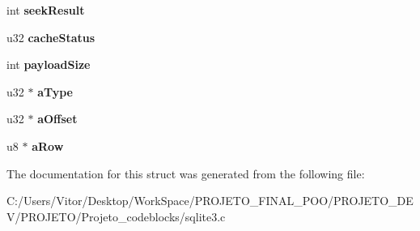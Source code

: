 \begin{DoxyCompactItemize}
\item 
\hypertarget{struct_vdbe_cursor_a5eff86e2a9c87dc15956ad362aa03f05}{int {\bfseries seek\-Result}}\label{struct_vdbe_cursor_a5eff86e2a9c87dc15956ad362aa03f05}

\item 
\hypertarget{struct_vdbe_cursor_acf243b5a94a6e5a11341d6fece473c00}{u32 {\bfseries cache\-Status}}\label{struct_vdbe_cursor_acf243b5a94a6e5a11341d6fece473c00}

\item 
\hypertarget{struct_vdbe_cursor_a5c1fa124d7f27a30e14ef0f455955cab}{int {\bfseries payload\-Size}}\label{struct_vdbe_cursor_a5c1fa124d7f27a30e14ef0f455955cab}

\item 
\hypertarget{struct_vdbe_cursor_a6992d2bf9eb8480985aec47dae58f1ab}{u32 $\ast$ {\bfseries a\-Type}}\label{struct_vdbe_cursor_a6992d2bf9eb8480985aec47dae58f1ab}

\item 
\hypertarget{struct_vdbe_cursor_a17431e67b341282aeb6c026cd01ec1e9}{u32 $\ast$ {\bfseries a\-Offset}}\label{struct_vdbe_cursor_a17431e67b341282aeb6c026cd01ec1e9}

\item 
\hypertarget{struct_vdbe_cursor_a6bd10979ffb5d4828967eea1d6e0d2c8}{u8 $\ast$ {\bfseries a\-Row}}\label{struct_vdbe_cursor_a6bd10979ffb5d4828967eea1d6e0d2c8}

\end{DoxyCompactItemize}


The documentation for this struct was generated from the following file\-:\begin{DoxyCompactItemize}
\item 
C\-:/\-Users/\-Vitor/\-Desktop/\-Work\-Space/\-P\-R\-O\-J\-E\-T\-O\-\_\-\-F\-I\-N\-A\-L\-\_\-\-P\-O\-O/\-P\-R\-O\-J\-E\-T\-O\-\_\-\-D\-E\-V/\-P\-R\-O\-J\-E\-T\-O/\-Projeto\-\_\-codeblocks/sqlite3.\-c\end{DoxyCompactItemize}
